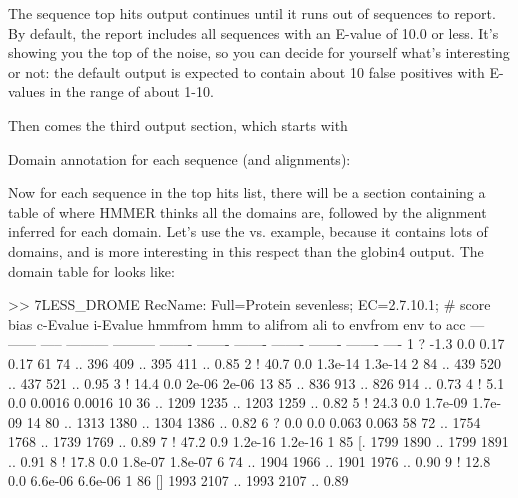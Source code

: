 The sequence top hits output continues until it runs out of sequences
to report. By default, the report includes all sequences with an
E-value of 10.0 or less. It's showing you the top of the noise, so you
can decide for yourself what's interesting or not: the default output
is expected to contain about 10 false positives with E-values in the
range of about 1-10.

Then comes the third output section, which starts with

\begin{sreoutput}
Domain annotation for each sequence (and alignments):
\end{sreoutput}

Now for each sequence in the top hits list, there will be a section 
containing a table of where HMMER thinks all the domains are,
followed by the alignment inferred for each domain. Let's use the
 vs.  example, because it contains lots
of domains, and is more interesting in this respect than the globin4
output.  The domain table for  looks like:

\begin{samepage}
\begin{sreoutput}
>> 7LESS_DROME  RecName: Full=Protein sevenless;          EC=2.7.10.1;
   #    score  bias  c-Evalue  i-Evalue hmmfrom  hmm to    alifrom  ali to    envfrom  env to     acc
 ---   ------ ----- --------- --------- ------- -------    ------- -------    ------- -------    ----
   1 ?   -1.3   0.0      0.17      0.17      61      74 ..     396     409 ..     395     411 .. 0.85
   2 !   40.7   0.0   1.3e-14   1.3e-14       2      84 ..     439     520 ..     437     521 .. 0.95
   3 !   14.4   0.0     2e-06     2e-06      13      85 ..     836     913 ..     826     914 .. 0.73
   4 !    5.1   0.0    0.0016    0.0016      10      36 ..    1209    1235 ..    1203    1259 .. 0.82
   5 !   24.3   0.0   1.7e-09   1.7e-09      14      80 ..    1313    1380 ..    1304    1386 .. 0.82
   6 ?    0.0   0.0     0.063     0.063      58      72 ..    1754    1768 ..    1739    1769 .. 0.89
   7 !   47.2   0.9   1.2e-16   1.2e-16       1      85 [.    1799    1890 ..    1799    1891 .. 0.91
   8 !   17.8   0.0   1.8e-07   1.8e-07       6      74 ..    1904    1966 ..    1901    1976 .. 0.90
   9 !   12.8   0.0   6.6e-06   6.6e-06       1      86 []    1993    2107 ..    1993    2107 .. 0.89
\end{sreoutput}
\end{samepage}


